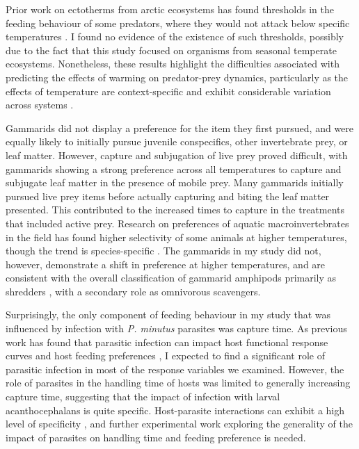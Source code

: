 Prior work on ectotherms from arctic ecosystems has found thresholds in the feeding behaviour of some predators, where they would not attack below specific temperatures \citep{ohlund2015}. I found no evidence of the existence of such thresholds, possibly due to the fact that this study focused on organisms from seasonal temperate ecosystems. Nonetheless, these results highlight the difficulties associated with predicting the effects of warming on predator-prey dynamics, particularly as the effects of temperature are context-specific and exhibit considerable variation across systems \citep{enlund2011, ohlund2015}. 

Gammarids did not display a preference for the item they first pursued, and were equally likely to initially pursue juvenile conspecifics, other invertebrate prey, or leaf matter. However, capture and subjugation of live prey proved difficult, with gammarids showing a strong preference across all temperatures to capture and subjugate leaf matter in the presence of mobile prey. Many gammarids initially pursued live prey items before actually capturing and biting the leaf matter presented. This contributed to the increased times to capture in the treatments that included active prey. Research on preferences of aquatic macroinvertebrates in the field has found higher selectivity of some animals at higher temperatures, though the trend is species-specific \citep{boersma2016, ogorman2016}. The gammarids in my study did not, however, demonstrate a shift in preference at higher temperatures, and are consistent with the overall classification of gammarid amphipods primarily as shredders \citep{cummins1979, macneil1997}, with a secondary role as omnivorous scavengers.   

Surprisingly, the only component of feeding behaviour in my study that was influenced by infection with \emph{P. minutus} parasites was capture time. As previous work has found that parasitic infection can impact host functional response curves \citep{toscano2014} and host feeding preferences \citep{bunke2015}, I expected to find a significant role of parasitic infection in most of the response variables we examined. However, the role of parasites in the handling time of hosts was limited to generally increasing capture time, suggesting that the impact of infection with larval acanthocephalans is quite specific. Host-parasite interactions can exhibit a high level of specificity \citep{hynes1958, zittel2018}, and further experimental work exploring the generality of the impact of parasites on handling time and feeding preference is needed. 

